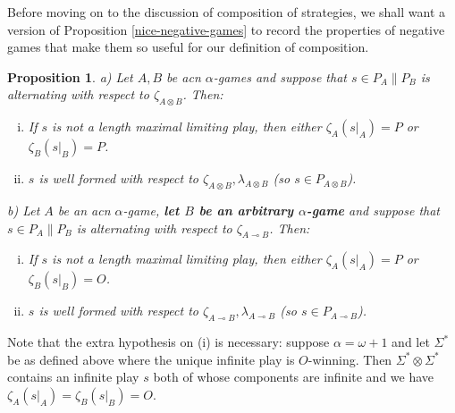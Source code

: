 \documentclass[11pt]{article} %
\theoremstyle{plain} %
\newtheorem{proposition}[theorem]{Proposition}
\theoremstyle{definition} %
\theoremstyle{note}
\theoremstyle{exercisestyle}
\newcommand{\tensor}{\otimes}
\renewcommand{\implies}{\multimap}
\newcommand{\st}{{\Sigma^*}}
\begin{document}
Before moving on to the discussion of composition of strategies, we shall want a version of Proposition \ref{nice-negative-games} to record the properties of negative games that make them so useful for our definition of composition.

\begin{proposition}
  \label{NiceAcnGames}
  a) Let $A,B$ be acn $\alpha$-games and suppose that $s\in P_A\|P_B$ is alternating with respect to $\zeta_{A\tensor B}$.  Then:
  \begin{enumerate}[i)]
    \item If $s$ is not a length maximal limiting play, then either $\zeta_A(s\vert_A)=P$ or $\zeta_B(s\vert_B)=P$.  
    \item $s$ is well formed with respect to $\zeta_{A\tensor B},\lambda_{A\tensor B}$ (so $s\in P_{A\tensor B}$).
  \end{enumerate}

  b) Let $A$ be an acn $\alpha$-game, {\bf let $B$ be an arbitrary $\alpha$-game} and suppose that $s\in P_A\|P_B$ is alternating with respect to $\zeta_{A\implies B}$.  Then:
  \begin{enumerate}[i)]
    \item If $s$ is not a length maximal limiting play, then either $\zeta_A(s\vert_A)=P$ or $\zeta_B(s\vert_B)=O$.
    \item $s$ is well formed with respect to $\zeta_{A\implies B},\lambda_{A\implies B}$ (so $s\in P_{A\implies B}$).
  \end{enumerate}
\end{proposition}

Note that the extra hypothesis on (i) is necessary: suppose $\alpha=\omega+1$ and let $\st$ be as defined above where the unique infinite play is $O$-winning.  Then $\st\tensor\st$ contains an infinite play $s$ both of whose components are infinite and we have $\zeta_A(s\vert_A)=\zeta_B(s\vert_B)=O$.  
\end{document}
